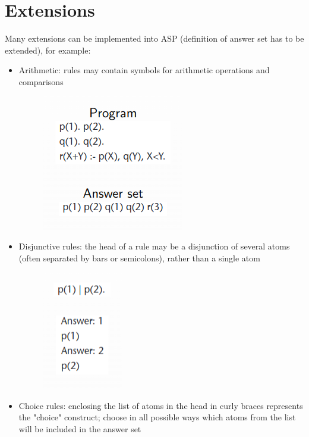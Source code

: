 \documentclass[10pt,a4paper]{report}
\begin{document}
\section{Extensions}
Many extensions can be implemented into ASP (definition of answer set has to be extended), for example:
\begin{itemize}
    \item Arithmetic: rules may contain symbols for arithmetic operations and comparisons
    \begin{figure}[H]
        \centering
        \includegraphics[scale=0.5]{47.png}
    \end{figure}
    \item Disjunctive rules: the head of a rule may be a disjunction of several atoms (often separated by bars or semicolons), rather than a single atom
    \begin{figure}[H]
        \centering
        \includegraphics[scale=0.5]{48.png}
    \end{figure}
    \item Choice rules: enclosing the list of atoms in the head in curly braces represents the "choice" construct; choose in all possible ways which atoms from the list will be included in the answer set
    \begin{figure}[H]
        \centering

\end{figure}
\end{itemize}
\end{document}
